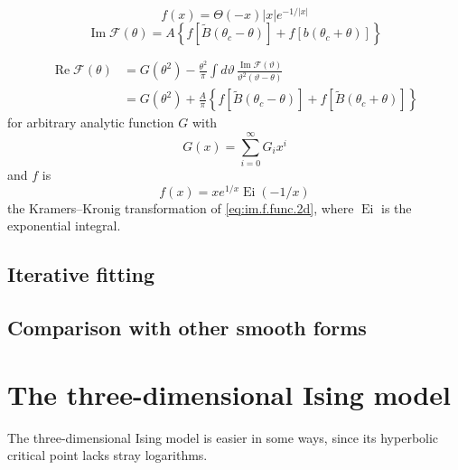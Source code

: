\documentclass[
  aps,
  prb,
  reprint,
  longbibliography,
  floatfix
]{revtex4-2}
\begin{document}
\begin{equation} \label{eq:im.f.func.2d}
  f(x)=\Theta(-x) |x| e^{-1/|x|}
\end{equation}
\begin{equation}
  \operatorname{Im}\mathcal F(\theta)=A\left\{f\left[\tilde B(\theta_c-\theta)\right]+f\left[b(\theta_c+\theta)\right]\right\}
\end{equation}

\begin{equation}
  \begin{aligned}
    \operatorname{Re}\mathcal F(\theta)
      &=G(\theta^2)-\frac{\theta^2}\pi\int d\vartheta\, \frac{\operatorname{Im}\mathcal F(\vartheta)}{\vartheta^2(\vartheta-\theta)} \\
      &=G(\theta^2)+\frac A\pi\left\{f[\tilde B(\theta_c-\theta)]+f[\tilde B(\theta_c+\theta)]\right\}
  \end{aligned}
\end{equation}
for arbitrary analytic function $G$ with
\begin{equation}
  G(x)=\sum_{i=0}^\infty G_ix^i
\end{equation}
and $f$ is
\begin{equation}
  f(x)=xe^{1/x}\operatorname{Ei}(-1/x)
\end{equation}
the Kramers--Kronig transformation of \eqref{eq:im.f.func.2d}, where $\operatorname{Ei}$ is the exponential integral.

\subsection{Iterative fitting}

\subsection{Comparison with other smooth forms}

\section{The three-dimensional Ising model}

The three-dimensional Ising model is easier in some ways, since its hyperbolic critical point lacks stray logarithms.
\end{document}
